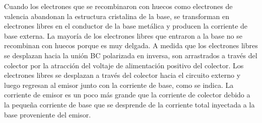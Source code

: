 Cuando los electrones que se recombinaron con huecos como electrones de valencia abandonan la estructura cristalina de la base, se transforman en electrones libres en el conductor de la base metálica y producen la corriente de base externa. La mayoría de los electrones libres que entraron a la base no se recombinan con huecos porque es muy delgada. A medida que los electrones libres se desplazan hacia la unión BC polarizada en inversa, son arrastrados a través del colector por la atracción del voltaje de alimentación positivo del colector. Los electrones libres se desplazan a través del colector hacia el circuito externo y luego regresan al emisor junto con la corriente de base, como se indica.
La corriente de emisor es un poco más grande que la corriente de colector debido a la pequeña corriente de base que se desprende de la corriente total inyectada a la base proveniente del emisor.

\newpage
